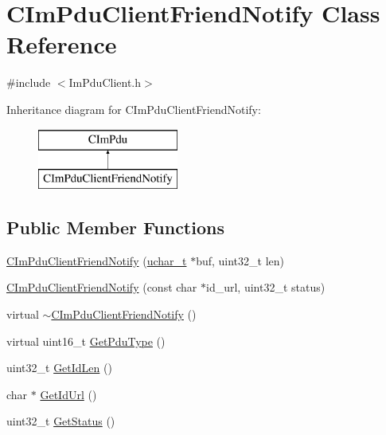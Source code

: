 \hypertarget{class_c_im_pdu_client_friend_notify}{}\section{C\+Im\+Pdu\+Client\+Friend\+Notify Class Reference}
\label{class_c_im_pdu_client_friend_notify}


{\ttfamily \#include $<$Im\+Pdu\+Client.\+h$>$}

Inheritance diagram for C\+Im\+Pdu\+Client\+Friend\+Notify\+:\begin{figure}[H]
\begin{center}
\leavevmode
\includegraphics[height=2.000000cm]{class_c_im_pdu_client_friend_notify}
\end{center}
\end{figure}
\subsection*{Public Member Functions}
\begin{DoxyCompactItemize}
\item 
\hyperlink{class_c_im_pdu_client_friend_notify_adea3e1c6dac967d7f17937eaaf28b660}{C\+Im\+Pdu\+Client\+Friend\+Notify} (\hyperlink{base_2ostype_8h_a124ea0f8f4a23a0a286b5582137f0b8d}{uchar\+\_\+t} $\ast$buf, uint32\+\_\+t len)
\item 
\hyperlink{class_c_im_pdu_client_friend_notify_a14b4712e14c0e6f46ee0888f329f27f0}{C\+Im\+Pdu\+Client\+Friend\+Notify} (const char $\ast$id\+\_\+url, uint32\+\_\+t status)
\item 
virtual \hyperlink{class_c_im_pdu_client_friend_notify_a0c65fc62bf4869b530bed9473d9e48e8}{$\sim$\+C\+Im\+Pdu\+Client\+Friend\+Notify} ()
\item 
virtual uint16\+\_\+t \hyperlink{class_c_im_pdu_client_friend_notify_a127aa4891ca6a1c97455fbafde7304d4}{Get\+Pdu\+Type} ()
\item 
uint32\+\_\+t \hyperlink{class_c_im_pdu_client_friend_notify_a3f4afdee4aa2ebc4bedeca9f6dc06afd}{Get\+Id\+Len} ()
\item 
char $\ast$ \hyperlink{class_c_im_pdu_client_friend_notify_acee8da25f6f175402f90797b803cdb99}{Get\+Id\+Url} ()
\item 
uint32\+\_\+t \hyperlink{class_c_im_pdu_client_friend_notify_ac7529327a1c4cac83a582332487d82d4}{Get\+Status} ()
\end{DoxyCompactItemize}
